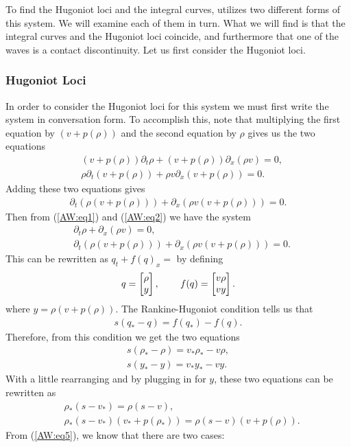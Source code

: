 \documentclass{article}
\begin{document}
To find the Hugoniot loci and the integral curves, \cite{AwRascle2000} utilizes two different forms of this system. 
We will examine each of them in turn. What we will find is that the integral curves and the Hugoniot loci coincide, 
and furthermore that one of the waves is a contact discontinuity. Let us first consider the Hugoniot loci. 

\subsubsection{Hugoniot Loci}
In order to consider the Hugoniot loci for this system we must first write the system in conversation form. 
To accomplish this, note that multiplying the first equation by $(v + p(\rho ))$ and the second equation 
by $\rho$ gives us the two equations 
\begin{align*}
&(v + p(\rho ))\partial_t\rho + (v + p(\rho ))\partial_x(\rho v) = 0,  \\
&\rho\partial_t \left(v + p(\rho )\right) + \rho v\partial_x \left( v + p(\rho )\right) = 0.
\end{align*}
Adding these two equations gives
\begin{align}\label{AW:eq2}
\partial_t \left(\rho\left(v + p(\rho )\right)\right) + \partial_x \left( \rho v\left(v + p(\rho )\right)\right) = 0.
\end{align}
Then from (\ref{AW:eq1}) and (\ref{AW:eq2}) we have the system 
\begin{align*}
&\partial_t\rho + \partial_x(\rho v) = 0, \\
&\partial_t \left(\rho\left(v + p(\rho )\right)\right) + \partial_x \left( \rho v\left(v + p(\rho )\right)\right) = 0.
\end{align*}
This can be rewritten as $q_t + f(q)_x = $ by defining
\begin{align*}
q = \left[ \begin{matrix}
\rho \\ y
\end{matrix}\right], \hspace{0.3in}
f(q) = \left[ \begin{matrix}
v\rho \\
vy
\end{matrix}\right].
\end{align*}
where $y = \rho\left(v + p(\rho )\right)$.
The Rankine-Hugoniot condition tells us that 
\begin{align*}
s(q_*- q) = f(q_*) - f(q).
\end{align*}
Therefore, from this condition we get the two equations
\begin{align}
s(\rho_* - \rho) = v_*\rho_* - v\rho, \label{AW:eq3}\\
s(y_* - y) = v_*y_* - vy.\label{AW:eq4}
\end{align}
With a little rearranging and by plugging in for $y$, these two equations can be rewritten as
\begin{align}
&\rho_*(s - v_*) = \rho (s - v), \label{AW:eq5}\\
&\rho_*(s - v_*)\left(v_* + p(\rho_* )\right) = \rho(s - v)\left(v + p(\rho )\right).\label{AW:eq6}
\end{align}
From (\ref{AW:eq5}), we know that there are two cases: 
\end{document}
